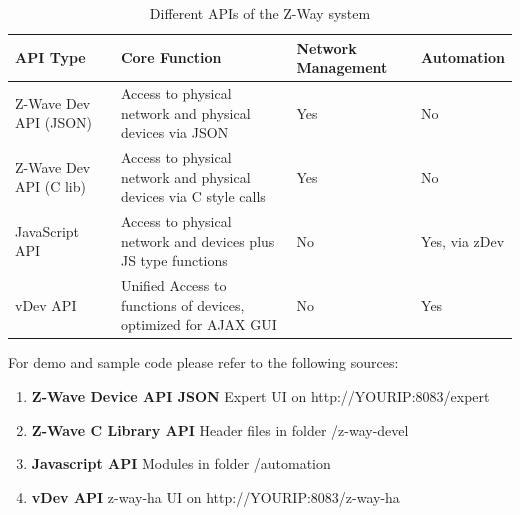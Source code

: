 \begin{table}
\begin{tabular}{|p{40mm}|p{50mm}|p{20mm}|p{20mm}|}
\hline
API Type &	Core Function & Network Management & Automation\\
\hline
Z-Wave Dev API (JSON)	& Access to physical network and physical devices via JSON	&
Yes	&No\\
\hline
Z-Wave Dev API (C lib) 	& Access to physical network and physical devices via C style calls &
Yes	&No\\
\hline
JavaScript API & Access to physical network and devices plus JS type functions	&
No	&Yes, via zDev\\
\hline
vDev API & Unified Access to functions of devices, optimized for AJAX GUI&
No	&Yes\\
\hline
\hline
\end{tabular}
\caption{Different APIs of the Z-Way system} 
\label{c1:comp}
\end{table}		

For demo and sample code please refer to the following sources:

\begin{enumerate}
\item \textbf{Z-Wave Device API JSON} Expert UI on http://YOURIP:8083/expert
\item \textbf{Z-Wave C Library API} Header files in folder /z-way-devel 
\item \textbf{Javascript API} Modules in folder /automation
\item \textbf{vDev API} z-way-ha UI on http://YOURIP:8083/z-way-ha
\end{enumerate}




 